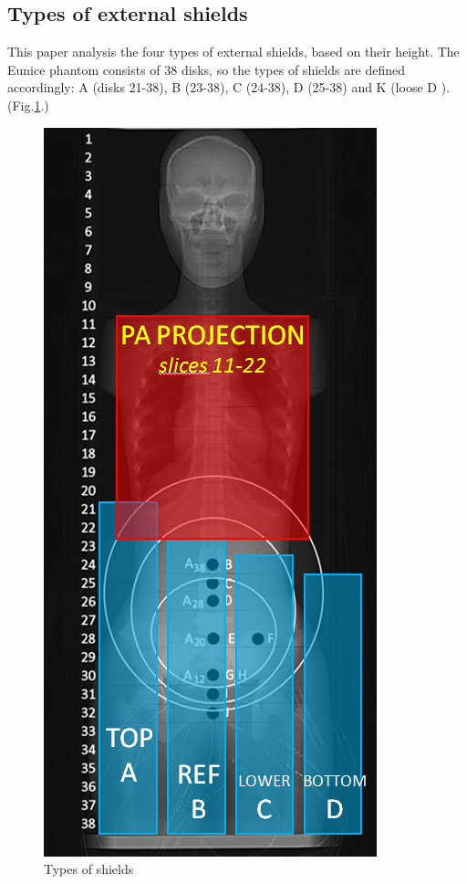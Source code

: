 \documentclass[fleqn,10pt]{SelfArx} %
\begin{document}
\subsection{Types of external shields}

This paper analysis the four types of external shields, based on their height. The Eunice phantom consists of 38 disks, so the types of shields are defined accordingly: A (disks 21-38), B (23-38), C (24-38), D (25-38) and K (loose D ). (Fig.\ref{fig:Shields}.)

\begin{figure}[!hbt]\centering
\includegraphics[width=0.9\linewidth]{Shields}
\caption{Types of shields}
\label{fig:Shields}
\end{figure}
\end{document}
